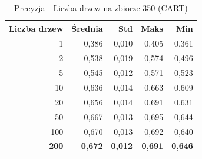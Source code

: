 \begin{table}[htbp]
\centering
\small
\setlength{\tabcolsep}{6pt}
\renewcommand{\arraystretch}{1.2}
\caption{Precyzja - Liczba drzew na zbiorze 350 (CART)}
\label{tab:CART_tree_count_350_precision}
\begin{tabular}{r|r|r|r|r}
\toprule
Liczba drzew & Średnia & Std & Maks & Min \\
\hline
1 & 0,386 & 0,010 & 0,405 & 0,361 \\
2 & 0,538 & 0,019 & 0,574 & 0,496 \\
5 & 0,545 & 0,012 & 0,571 & 0,523 \\
10 & 0,636 & 0,014 & 0,663 & 0,609 \\
20 & 0,656 & 0,014 & 0,691 & 0,631 \\
50 & 0,667 & 0,013 & 0,695 & 0,644 \\
100 & 0,670 & 0,013 & 0,692 & 0,640 \\
\textbf{200} & \textbf{0,672} & \textbf{0,012} & \textbf{0,691} & \textbf{0,646} \\
\bottomrule
\end{tabular}
\end{table}